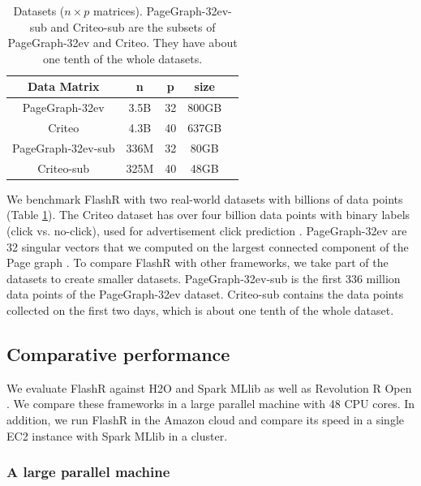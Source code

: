 \begin{table}
\begin{center}
\footnotesize
\begin{tabular}{|c|c|c|c|c|}
\hline
Data Matrix & n & p & size \\
\hline
PageGraph-32ev \cite{webgraph} & 3.5B & 32 & 800GB \\
\hline
Criteo \cite{criteo} & 4.3B & 40 & 637GB \\
\hline
PageGraph-32ev-sub \cite{webgraph} & 336M & 32 & 80GB \\
\hline
Criteo-sub \cite{criteo} & 325M & 40 & 48GB \\
\hline
\end{tabular}
\normalsize
\end{center}
\caption{Datasets ($n \times p$ matrices). PageGraph-32ev-sub and
	Criteo-sub are the subsets of PageGraph-32ev and Criteo. They
	have about one tenth of the whole datasets.}
\label{tbl:data}
\vspace{-5pt}
\end{table}

We benchmark FlashR with two real-world datasets with billions of data points
(Table \ref{tbl:data}). The Criteo dataset has over four billion data points
with binary labels (click vs. no-click), used for advertisement click
prediction \cite{criteo}. PageGraph-32ev are 32 singular vectors that we
computed on the largest connected component of the Page graph \cite{webgraph}.
To compare FlashR with other frameworks, we take part of the datasets to
create smaller datasets. PageGraph-32ev-sub is the first 336 million data points
of the PageGraph-32ev dataset. Criteo-sub contains the data points collected
on the first two days, which is about one tenth of the whole dataset.

\subsection{Comparative performance}
We evaluate FlashR against H2O \cite{h2o} and Spark MLlib \cite{mllib} as well
as Revolution R Open \cite{rro}. We compare these frameworks in a large
parallel machine with 48 CPU cores. In addition, we run FlashR in the Amazon
cloud and compare its speed in a single EC2 instance with Spark MLlib in
a cluster.

\subsubsection{A large parallel machine}

